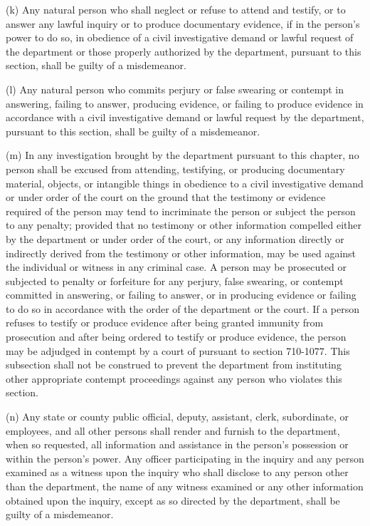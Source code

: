      (k)  Any natural person who shall neglect or refuse to attend and testify, or to answer any lawful inquiry or to produce documentary evidence, if in the person's power to do so, in obedience of a civil investigative demand or lawful request of the department or those properly authorized by the department, pursuant to this section, shall be guilty of a misdemeanor.

     (l)  Any natural person who commits perjury or false swearing or contempt in answering, failing to answer, producing evidence, or failing to produce evidence in accordance with a civil investigative demand or lawful request by the department, pursuant to this section, shall be guilty of a misdemeanor.

     (m)  In any investigation brought by the department pursuant to this chapter, no person shall be excused from attending, testifying, or producing documentary material, objects, or intangible things in obedience to a civil investigative demand or under order of the court on the ground that the testimony or evidence required of the person may tend to incriminate the person or subject the person to any penalty; provided that no testimony or other information compelled either by the department or under order of the court, or any information directly or indirectly derived from the testimony or other information, may be used against the individual or witness in any criminal case.  A person may be prosecuted or subjected to penalty or forfeiture for any perjury, false swearing, or contempt committed in answering, or failing to answer, or in producing evidence or failing to do so in accordance with the order of the department or the court.  If a person refuses to testify or produce evidence after being granted immunity from prosecution and after being ordered to testify or produce evidence, the person may be adjudged in contempt by a court of pursuant to section 710-1077.  This subsection shall not be construed to prevent the department from instituting other appropriate contempt proceedings against any person who violates this section.

     (n)  Any state or county public official, deputy, assistant, clerk, subordinate, or employees, and all other persons shall render and furnish to the department, when so requested, all information and assistance in the person's possession or within the person's power.  Any officer participating in the inquiry and any person examined as a witness upon the inquiry who shall disclose to any person other than the department, the name of any witness examined or any other information obtained upon the inquiry, except as so directed by the department, shall be guilty of a misdemeanor.


